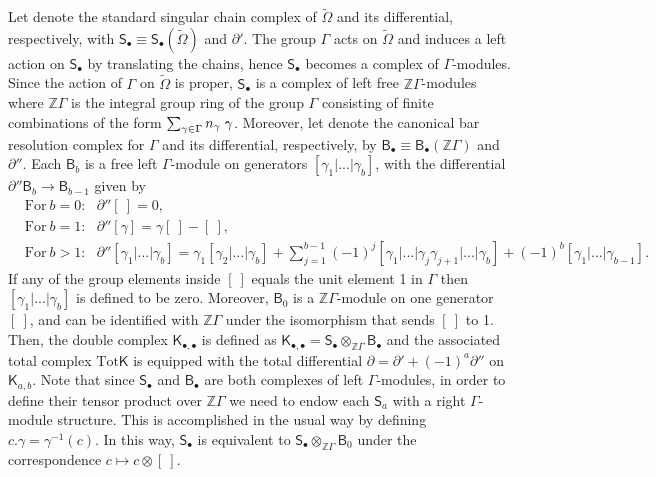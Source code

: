 \documentclass[a4paper,11pt]{article}
\newcommand{\compfontdii}[1]{\bm{\mathsf{#1}}_{\bullet , \bullet}}
\newcommand{\compfontdi}[1]{\bm{\mathsf{#1}}_{\bullet}}
\newcommand{\compfont}[1]{\bm{\mathsf{#1}}}
\begin{document}
Let denote the standard singular chain complex of $\tilde{\Omega}$ and its differential, respectively, with $\compfontdi{S}\equiv \compfontdi{S}(\tilde{\Omega})$ and $\partial'$. The group $\Gamma$ acts on $\tilde{\Omega}$ and induces a left action on $\compfontdi{S}$ by translating the chains, hence $\compfontdi{S}$ becomes a complex of  $\Gamma$-modules. Since
the action of $\Gamma$ on $\tilde{\Omega}$ is proper, $\compfontdi{S}$ is a complex of left free $\mathbb{Z}\Gamma$-modules  where
$\mathbb{Z}\Gamma$ is the integral group ring of the group $\Gamma$ consisting of finite combinations of the form $\sum_{\gamma\in\Gamma} n_{\gamma}\hspace{1mm}\gamma$. Moreover, let denote the canonical bar resolution complex for $\Gamma$ and its differential, respectively, by
 $\compfontdi{B}\equiv \compfontdi{B}(\mathbb{Z}\Gamma)$ and $\partial''$.  Each $\compfont{B}_{b}$ is a free left $\Gamma$-module on generators $[\gamma_1|...|\gamma_b]$, with the differential $\partial'' \compfont{B}_b\rightarrow \compfont{B}_{b-1}$ given by
\begin{equation}
\begin{split}
&\text{For}~ b=0:~~~\partial''[~] = 0,\\
&\text{For}~ b=1:~~~\partial''[\gamma] = \gamma[~]-[~],\\
&\text{For}~b>1:~~~\partial'' [\gamma_1|...|\gamma_b] = \gamma_{1} [\gamma_2|...|\gamma_b]+\sum_{j=1}^{b-1}(-1)^j [\gamma_1|...|\gamma_{j}\gamma_{j+1}|...|\gamma_b]+(-1)^b [\gamma_1|...|\gamma_{b-1}].\nonumber
\end{split}
\end{equation}
If any of the group elements inside $[~]$ equals the unit element 1 in $\Gamma$ then $[\gamma_{1}|...|\gamma_{b}]$ is defined to be zero. Moreover, $\compfont{B}_{0}$ is a $\mathbb{Z}\Gamma$-module on one generator $[~]$, and can be identified with $\mathbb{Z}\Gamma$ under the isomorphism that sends $[~]$ to 1. Then, the double complex $\compfontdii{K}$ is defined as $\compfontdii{K}=\compfontdi{S}\otimes_{\mathbb{Z}\Gamma}\compfontdi{B}$ and the associated total 
complex $\text{Tot}\compfont{K}$ is equipped with the total differential $\partial=\partial'+(-1)^a \partial''$ on $\compfont{K}_{a,b}$. 
Note that since $\compfontdi{S}$ and $\compfontdi{B}$ are both complexes of left $\Gamma$-modules, in order to
define their tensor product over $\mathbb{Z}\Gamma$ we need to endow each $\compfont{S}_a$ with a right $\Gamma$-module structure. This is accomplished in the usual way by defining $c.\gamma= \gamma^{-1}(c)$. 
In this way, $\compfontdi{S}$ is equivalent to $\compfontdi{S}\otimes_{\mathbb{Z}\Gamma}\compfont{B}_{0}$ under
the correspondence $c\mapsto c\otimes[~]$.
\end{document}
